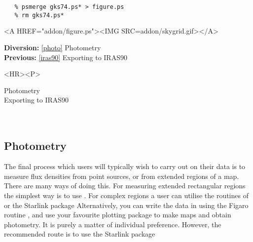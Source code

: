 \begin{verbatim}
   % psmerge gks74.ps* > figure.ps
   % rm gks74.ps*
\end{verbatim}

\begin{latexonly}
\begin{center}
\leavevmode\epsfysize=100mm
\end{center}
\end{latexonly}
\begin{htmlonly}
\begin{rawhtml} <A HREF="addon/figure.ps"><IMG SRC=addon/skygrid.gif></A> \end{rawhtml}
\end{htmlonly}

\begin{latexonly}
{\bf Diversion:} \ref{photo} Photometry\\
{\bf Previous:} \ref{iras90} Exporting to IRAS90\\
\end{latexonly}

\begin{htmlonly}
\begin{rawhtml} <HR><P> \end{rawhtml}
{\bf {}} Photometry\\
{\bf {}} Exporting to IRAS90\\
{\bf {}}\\
{\bf {}}\\
\end{htmlonly}


\subsection{\label{photo}Photometry}

   The final process which users will typically wish to carry out on
   their data is to measure flux densities from point sources, or from
   extended regions of a map. There are many ways of doing this. For
   measuring extended rectangular regions the simplest way is to use
{\tt {}}.
   For complex regions a user can utilise the routines of
   or the Starlink package
   Alternatively, you can write the data in
   using the Figaro routine
{\tt {}},
   and use your favourite plotting package to make maps and obtain
   photometry. It is purely a matter of individual preference. However,
   the recommended route is to use the Starlink package

